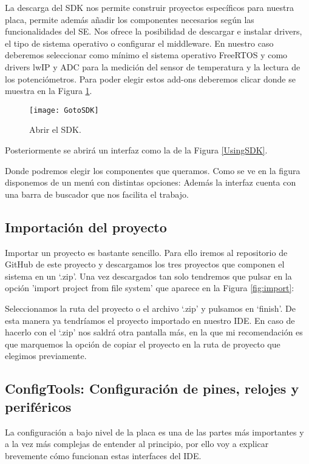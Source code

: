 La descarga del SDK nos permite construir proyectos específicos para nuestra placa, permite además añadir los componentes necesarios según las funcionalidades del SE. Nos ofrece la posibilidad de descargar e instalar drivers, el tipo de sistema operativo o configurar el middleware. En nuestro caso deberemos seleccionar como mínimo el sistema operativo FreeRTOS y como drivers lwIP y ADC para la medición del sensor de temperatura y la lectura de los potenciómetros. Para poder elegir estos add-ons deberemos clicar donde se muestra en la Figura \ref{clickSDK}.

\begin{figure}[!h]
	\centering
	\texttt{[image: GotoSDK]}
	\caption{Abrir el SDK.}
	\label{clickSDK}
\end{figure}
\FloatBarrier

Posteriormente se abrirá un interfaz como la de la Figura \ref{UsingSDK}.

 \label{fig:UsingSDK}


Donde podremos elegir los componentes que queramos. Como se ve en la figura disponemos de un menú con distintas opciones:  Además la interfaz cuenta con una barra de buscador que nos facilita el trabajo.

\subsection{Importación del proyecto}
Importar un proyecto es bastante sencillo. Para ello iremos al repositorio de GitHub de este proyecto y descargamos los tres proyectos que componen el sistema en un `.zip'. Una vez descargados tan solo tendremos que pulsar en la opción 'import project from file system' que aparece en la Figura \ref{fig:import}:

 \label{import}

Seleccionamos la ruta del proyecto o el archivo `.zip' y pulsamos en `finish'. De esta manera ya tendríamos el proyecto importado en nuestro IDE. En caso de hacerlo con el `.zip' nos saldrá otra pantalla más, en la que mi recomendación es que marquemos la opción de copiar el proyecto en la ruta de proyecto que elegimos previamente.

\subsection{ConfigTools: Configuración de pines, relojes y periféricos}
La configuración a bajo nivel de la placa es una de las partes más importantes y a la vez más complejas de entender al principio, por ello voy a explicar brevemente cómo funcionan estas interfaces del IDE.

